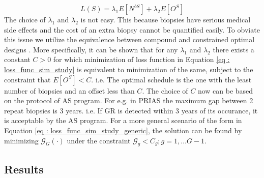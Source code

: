 \begin{equation}
\label{eq : loss_func_sim_study}
L(S) = \lambda_1 E[N^{bS}] + \lambda_2 E[O^S] 
\end{equation}
The choice of $\lambda_1$ and $\lambda_2$ is not easy. This because biopsies have serious medical side effects and the cost of an extra biopsy cannot be quantified easily. To obviate this issue we utilize the equivalence between compound and constrained optimal designs \citep{cook1994equivalence}. More specifically, it can be shown that for any $\lambda_1$ and $\lambda_2$ there exists a constant $C>0$ for which minimization of loss function in Equation \ref{eq : loss_func_sim_study} is equivalent to minimization of the same, subject to the constraint that $E[O^S] < C$. i.e. The optimal schedule is the one with the least number of biopsies and an offset less than $C$. The choice of $C$ now can be based on the protocol of AS program. For e.g. in PRIAS the maximum gap between 2 repeat biopsies is 3 years. i.e. If GR is detected within 3 years of its occurance, it is acceptable by the AS program. For a more general scenario of the form in Equation \ref{eq : loss_func_sim_study_generic}, the solution can be found by minimizing $\mathcal{G}_G(\cdot)$ under the constraint $\mathcal{G}_g < C_g; g=1, \ldots G-1$. 

\subsection{Results}
